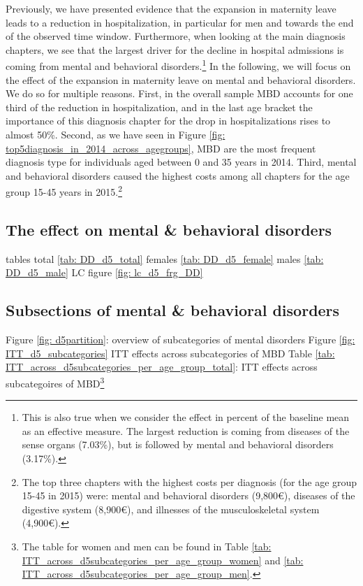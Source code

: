 \documentclass[11pt, a4paper]{article} %
\begin{document}
Previously, we have presented evidence that the expansion in maternity leave leads to a reduction in hospitalization, in particular for men and towards the end of the observed time window. Furthermore, when looking at the main diagnosis chapters, we see that the largest driver for the decline in hospital admissions is coming from mental and behavioral disorders.\footnote{This is also true when we consider the effect in percent of the baseline mean as an effective measure. The largest reduction is coming from diseases of the sense organs (7.03\%), but is followed by mental and behavioral disorders (3.17\%).} In the following, we will focus on the effect of the expansion in maternity leave on mental and behavioral disorders. We do so for multiple reasons. First, in the overall sample MBD accounts for one third of the reduction in hospitalization, and in the last age bracket the importance of this diagnosis chapter for the drop in hospitalizations rises to almost 50\%. Second, as we have seen in Figure \ref{fig: top5diagnosis_in_2014_across_agegroups}, MBD are the most frequent diagnosis type for individuals aged between 0 and 35 years in 2014. Third, mental and behavioral disorders caused the highest costs among all chapters for the age group 15-45 years in 2015.\footnote{The top three chapters with the highest costs per diagnosis (for the age group 15-45 in 2015) were: mental and behavioral disorders (9,800{\euro}), diseases of the digestive system (8,900{\euro}), and illnesses of the musculoskeletal system (4,900{\euro}).} 






\bigskip
\subsection{The effect on mental \& behavioral disorders}
tables
total	\ref{tab: DD_d5_total}
females	\ref{tab: DD_d5_female}
males	\ref{tab: DD_d5_male}
LC figure
\ref{fig: lc_d5_frg_DD}


\subsection{Subsections of mental \& behavioral disorders}
Figure \ref{fig: d5partition}: overview of subcategories of mental disorders
Figure \ref{fig: ITT_d5_subcategories} ITT effects across subcategories of MBD
Table \ref{tab: ITT_across_d5subcategories_per_age_group_total}: ITT effects across subcategoires of MBD\footnote{The table for women and men can be found in Table \ref{tab: ITT_across_d5subcategories_per_age_group_women} and \ref{tab: ITT_across_d5subcategories_per_age_group_men}.}
\end{document}
